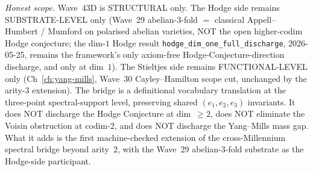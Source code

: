 \begin{remark}
\emph{Honest scope.} Wave~43D is STRUCTURAL only. The Hodge side remains SUBSTRATE-LEVEL only (Wave~29 abelian-3-fold $=$ classical Appell--Humbert / Mumford on polarised abelian varieties, NOT the open higher-codim Hodge conjecture; the dim-$1$ Hodge result \texttt{hodge\_dim\_one\_full\_discharge}, 2026-05-25, remains the framework's only axiom-free Hodge-Conjecture-direction discharge, and only at dim~$1$). The Stieltjes side remains FUNCTIONAL-LEVEL only (Ch~\ref{ch:yang-mills}, Wave~30 Cayley--Hamilton scope cut, unchanged by the arity-$3$ extension). The bridge is a definitional vocabulary translation at the three-point spectral-support level, preserving shared $(e_1, e_2, e_3)$ invariants. It does NOT discharge the Hodge Conjecture at dim~$\geq 2$, does NOT eliminate the Voisin obstruction at codim-$2$, and does NOT discharge the Yang--Mills mass gap. What it adds is the first machine-checked extension of the cross-Millennium spectral bridge beyond arity~$2$, with the Wave~29 abelian-3-fold substrate as the Hodge-side participant.
\end{remark}

